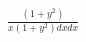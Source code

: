 \documentclass[preview]{standalone}
\begin{document}
\begin{align*}
\frac{\left( 1 + {y}^{2} \right)}{x \left( 1 + {y}^{2} \right) dx dx}
\end{align*}
\end{document}
